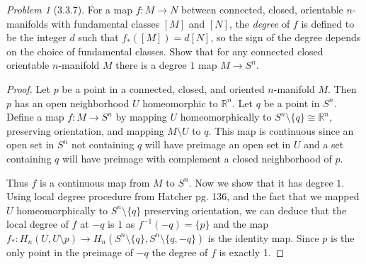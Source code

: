 \documentclass[10pt]{article}
\newcommand{\sk}{\vskip 10mm}
\newcommand{\bb}[1]{\mathbb{#1}}
\theoremstyle{remark}
\newtheorem{problem}{Problem}
\begin{document}
\sk

\begin{problem}[3.3.7]
  For a map $f:M\rightarrow N$ between connected, closed, orientable $n$-manifolds
  with fundamental classes $[M]$ and $[N]$, the \textit{degree} of $f$ is
  defined to be the integer $d$ such that $f_*([M])=d[N]$, so the sign of the
  degree depends on the choice of fundamental classes. Show that for any
  connected closed orientable $n$-manifold $M$ there is a degree $1$ map
  $M\rightarrow S^n$.
\end{problem}

\begin{proof}
  Let $p$ be a point in a connected, closed, and oriented $n$-manifold $M$.
  Then $p$ has an open neighborhood $U$ homeomorphic to $\bb{R}^n$. Let $q$
  be a point in $S^n$. Define a map $f:M\rightarrow S^n$ by mapping $U$ homeomorphically
  to $S^n\setminus\{q\}\cong \bb{R}^n$, preserving orientation,
  and mapping $M\setminus U$ to $q$. This map is continuous since an open set in $S^n$
  not containing $q$ will have preimage an open set in $U$ and a set containing
  $q$ will have preimage with complement a closed neighborhood of $p$.

  Thus $f$ is a continuous map from $M$ to $S^n$. Now we show that it has
  degree $1$. Using local degree procedure from Hatcher pg. 136, and the fact
  that we mapped $U$ homeomorphically to $S^n\setminus\{q\}$ preserving orientation, we
  can deduce that the local degree of $f$ at $-q$ is $1$ as
  $f^{-1}(-q)=\{p\}$ and the map $f_*:H_n(U,U\setminus p)\rightarrow H_n(S^n\setminus \{q\},S^n\setminus\{q,-q\})$ is
  the identity map. Since $p$ is the only point in the preimage of $-q$ the
  degree of $f$ is exactly 1.
\end{proof}
\end{document}
